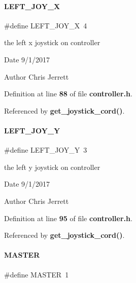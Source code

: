\paragraph{L\+E\+F\+T\+\_\+\+J\+O\+Y\+\_\+X}
{\footnotesize\ttfamily \#define L\+E\+F\+T\+\_\+\+J\+O\+Y\+\_\+X~4}



the left x joystick on controller 

\begin{DoxyDate}{Date}
9/1/2017 
\end{DoxyDate}
\begin{DoxyAuthor}{Author}
Chris Jerrett 
\end{DoxyAuthor}


Definition at line \textbf{ 88} of file \textbf{ controller.\+h}.



Referenced by \textbf{ get\+\_\+joystick\+\_\+cord()}.

\mbox{\label{a00011_ae0a2b64db5fc4f4bf4b169185be93db3}} 
\paragraph{L\+E\+F\+T\+\_\+\+J\+O\+Y\+\_\+Y}
{\footnotesize\ttfamily \#define L\+E\+F\+T\+\_\+\+J\+O\+Y\+\_\+Y~3}



the left y joystick on controller 

\begin{DoxyDate}{Date}
9/1/2017 
\end{DoxyDate}
\begin{DoxyAuthor}{Author}
Chris Jerrett 
\end{DoxyAuthor}


Definition at line \textbf{ 95} of file \textbf{ controller.\+h}.



Referenced by \textbf{ get\+\_\+joystick\+\_\+cord()}.

\mbox{\label{a00011_a3fa2d3bf1901157f734a584d47b25d8b}} 
\paragraph{M\+A\+S\+T\+ER}
{\footnotesize\ttfamily \#define M\+A\+S\+T\+ER~1}



